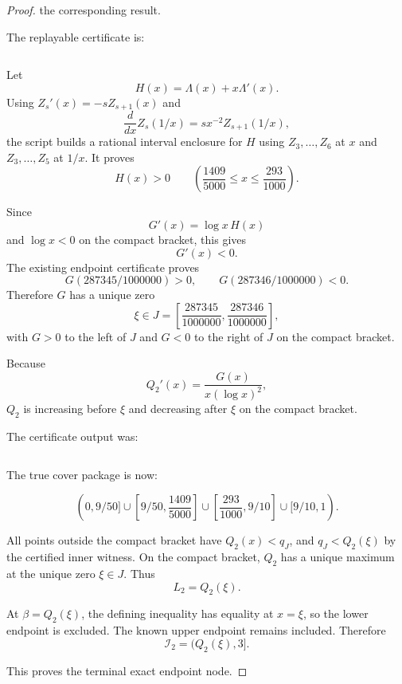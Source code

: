 \begin{proof}
the corresponding result.

The replayable certificate is:

\begin{verbatim}
\end{verbatim}

Let
\[
H(x)=\Lambda(x)+x\Lambda'(x).
\]
Using \(Z_s'(x)=-sZ_{s+1}(x)\) and
\[
\frac{d}{dx}Z_s(1/x)=s x^{-2} Z_{s+1}(1/x),
\]
the script builds a rational interval enclosure for \(H\) using \(Z_3,\ldots,Z_6\) at \(x\) and \(Z_3,\ldots,Z_5\) at \(1/x\). It proves
\[
H(x)>0
\qquad
\left(\frac{1409}{5000}\le x\le\frac{293}{1000}\right).
\]

Since
\[
G'(x)=\log x\,H(x)
\]
and \(\log x<0\) on the compact bracket, this gives
\[
G'(x)<0.
\]
The existing endpoint certificate proves
\[
G(287345/1000000)>0,
\qquad
G(287346/1000000)<0.
\]
Therefore \(G\) has a unique zero
\[
\xi\in J=\left[\frac{287345}{1000000},\frac{287346}{1000000}\right],
\]
with \(G>0\) to the left of \(J\) and \(G<0\) to the right of \(J\) on the compact bracket.

Because
\[
Q_2'(x)=\frac{G(x)}{x(\log x)^2},
\]
\(Q_2\) is increasing before \(\xi\) and decreasing after \(\xi\) on the compact bracket.

The certificate output was:

\begin{verbatim}
\end{verbatim}

The true cover package is now:

\[
(0,9/50]\cup
\left[9/50,\frac{1409}{5000}\right]\cup
\left[\frac{293}{1000},9/10\right]\cup
[9/10,1).
\]

All points outside the compact bracket have \(Q_2(x)<q_J\), and \(q_J<Q_2(\xi)\) by the certified inner witness. On the compact bracket, \(Q_2\) has a unique maximum at the unique zero \(\xi\in J\). Thus
\[
L_2=Q_2(\xi).
\]

At \(\beta=Q_2(\xi)\), the defining inequality has equality at \(x=\xi\), so the lower endpoint is excluded. The known upper endpoint remains included. Therefore
\[
\mathcal I_2=(Q_2(\xi),3].
\]

This proves the terminal exact endpoint node.
\end{proof}

